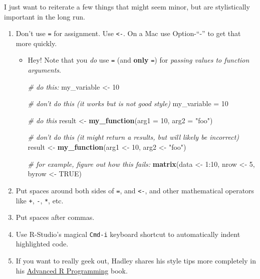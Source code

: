 \documentclass[]{book}
\newenvironment{Shaded}{\begin{snugshade}}{\end{snugshade}}
\newcommand{\KeywordTok}[1]{\textcolor[rgb]{0.13,0.29,0.53}{\textbf{{#1}}}}
\newcommand{\DataTypeTok}[1]{\textcolor[rgb]{0.13,0.29,0.53}{{#1}}}
\newcommand{\DecValTok}[1]{\textcolor[rgb]{0.00,0.00,0.81}{{#1}}}
\newcommand{\StringTok}[1]{\textcolor[rgb]{0.31,0.60,0.02}{{#1}}}
\newcommand{\CommentTok}[1]{\textcolor[rgb]{0.56,0.35,0.01}{\textit{{#1}}}}
\newcommand{\OtherTok}[1]{\textcolor[rgb]{0.56,0.35,0.01}{{#1}}}
\newcommand{\NormalTok}[1]{{#1}}
\providecommand{\tightlist}{%
  \setlength{\itemsep}{0pt}\setlength{\parskip}{0pt}}
\theoremstyle{definition}
\theoremstyle{definition}
\theoremstyle{remark}
\begin{document}
I just want to reiterate a few things that might seem minor, but are
stylistically important in the long run.

\begin{enumerate}
\def\labelenumi{\arabic{enumi}.}
\tightlist
\item
  Don't use \texttt{=} for assignment. Use \texttt{\textless{}-}. On a
  Mac use Option-``-'' to get that more quickly.

  \begin{itemize}
  \item
    Hey! Note that you \emph{do} use \texttt{=} (and \textbf{only}
    \texttt{=}) for \emph{passing values to function arguments}.

\begin{Shaded}
\begin{Highlighting}[]
\CommentTok{# do this:}
\NormalTok{my_variable <-}\StringTok{ }\DecValTok{10}

\CommentTok{# don't do this (it works but is not good style)}
\NormalTok{my_variable =}\StringTok{ }\DecValTok{10}


\CommentTok{# do this}
\NormalTok{result <-}\StringTok{ }\KeywordTok{my_function}\NormalTok{(}\DataTypeTok{arg1 =} \DecValTok{10}\NormalTok{, }\DataTypeTok{arg2 =} \StringTok{"foo"}\NormalTok{)}

\CommentTok{# don't do this (it might return a results, but will likely be incorrect)}
\NormalTok{result <-}\StringTok{ }\KeywordTok{my_function}\NormalTok{(arg1 <-}\StringTok{ }\DecValTok{10}\NormalTok{, arg2 <-}\StringTok{ "foo"}\NormalTok{)}

\CommentTok{# for example, figure out how this fails:}
\KeywordTok{matrix}\NormalTok{(data <-}\StringTok{ }\DecValTok{1}\NormalTok{:}\DecValTok{10}\NormalTok{, nrow <-}\StringTok{ }\DecValTok{5}\NormalTok{, byrow <-}\StringTok{ }\OtherTok{TRUE}\NormalTok{)}
\end{Highlighting}
\end{Shaded}
  \end{itemize}
\item
  Put spaces around both sides of \texttt{=}, and \texttt{\textless{}-},
  and other mathematical operators like \texttt{+}, \texttt{-},
  \texttt{*}, etc.
\item
  Put spaces after commas.
\item
  Use R-Studio's magical \texttt{Cmd-i} keyboard shortcut to
  automatically indent highlighted code.
\item
  If you want to really geek out, Hadley shares his style tips more
  completely in his \href{http://adv-r.had.co.nz/Style.html}{Advanced R
  Programming} book.
\end{enumerate}
\end{document}
